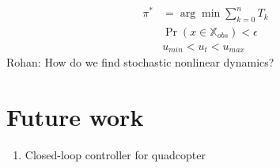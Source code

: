 \documentclass[conference]{IEEEtran}
\newcommand{\rohan}[1]{{\color{blue} Rohan: #1}}
\begin{document}
\begin{align}
\pi^{*} &= \arg\min \sum_{k=0}^n T_k\\
\nonumber & \Pr(x\in \mathbb{X}_{obs}) < \epsilon \\
\nonumber & u_{min} < u_t < u_{max}
\end{align}
\rohan{How do we find stochastic nonlinear dynamics?} \\

\section{Future work}
\begin{enumerate}
    \item Closed-loop controller for quadcopter
\end{enumerate}

\printbibliography
\end{document}
